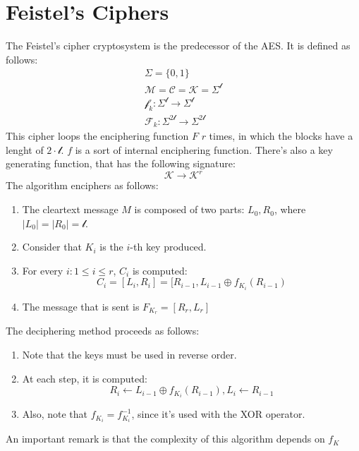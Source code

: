 \section{Feistel's Ciphers}
The Feistel's cipher cryptosystem is the predecessor of the AES. It is defined as follows:
\begin{align*}
    \Sigma = \{0,1\} \\
    \mathcal{M} = \mathcal{C} = \mathcal{K} = \Sigma^{\mathcal{l}}\\
    \mathcal{f}_{k}: \Sigma^{\mathcal{l}} \rightarrow \Sigma^{\mathcal{l}}\\
    \mathcal{F}_{k}: \Sigma^{2\mathcal{l}} \rightarrow \Sigma^{2\mathcal{l}}
\end{align*}
This cipher loops the enciphering function $F$ $r$ times, in which the blocks have a lenght of $2 \cdot \mathcal{l}$. $f$ is a sort of internal enciphering function. \newline
There's also a key generating function, that has the following signature:
\[\mathcal{K} \rightarrow \mathcal{K}^{r}\]
The algorithm enciphers as follows:
\begin{enumerate}
    \item The cleartext message $M$ is composed of two parts: $L_{0}, R_{0}$, where $|L_{0}| = |R_{0}| = \mathcal{l}$.
    \item Consider that $K_{i}$ is the $i$-th key produced.
    \item For every $i: 1 \leq i \leq r$, $C_{i}$ is computed:
    \[C_{i} = [L_{i}, R_{i}] = [R_{i-1}, L_{i-1} \oplus f_{K_{i}}(R_{i-1})\]
    \item The message that is sent is $F_{K_{r}} = [R_{r}, L_{r}]$
\end{enumerate}
The deciphering method proceeds as follows:
\begin{enumerate}
    \item Note that the keys must be used in reverse order.
    \item At each step, it is computed:
    \[R_{i} \gets L_{i-1} \oplus f_{K_{i}}(R_{i-1}), L_{i} \gets R_{i-1}\]
    \item Also, note that $f_{K_{i}} = f^{-1}_{K_{i}}$, since it's used with the XOR operator.
\end{enumerate}
An important remark is that the complexity of this algorithm depends on $f_{K}$
